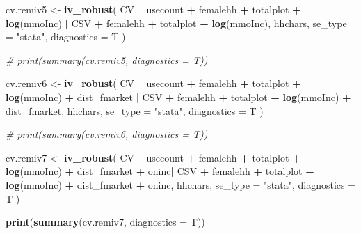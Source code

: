\documentclass[
]{article}
\newenvironment{Shaded}{\begin{snugshade}}{\end{snugshade}}
\newcommand{\CommentTok}[1]{\textcolor[rgb]{0.56,0.35,0.01}{\textit{#1}}}
\newcommand{\DataTypeTok}[1]{\textcolor[rgb]{0.13,0.29,0.53}{#1}}
\newcommand{\KeywordTok}[1]{\textcolor[rgb]{0.13,0.29,0.53}{\textbf{#1}}}
\newcommand{\NormalTok}[1]{#1}
\newcommand{\OperatorTok}[1]{\textcolor[rgb]{0.81,0.36,0.00}{\textbf{#1}}}
\newcommand{\StringTok}[1]{\textcolor[rgb]{0.31,0.60,0.02}{#1}}
\begin{document}
\begin{Shaded}
\begin{Highlighting}[]
\NormalTok{cv.remiv5 <-}
\StringTok{  }\KeywordTok{iv_robust}\NormalTok{(}
\NormalTok{    CV }\OperatorTok{~}\StringTok{ }\NormalTok{usecount }\OperatorTok{+}\StringTok{ }\NormalTok{femalehh }\OperatorTok{+}\StringTok{ }\NormalTok{totalplot }\OperatorTok{+}\StringTok{ }\KeywordTok{log}\NormalTok{(mmoInc) }\OperatorTok{|}
\StringTok{      }\NormalTok{CSV }\OperatorTok{+}\StringTok{ }\NormalTok{femalehh }\OperatorTok{+}\StringTok{ }\NormalTok{totalplot }\OperatorTok{+}\StringTok{ }\KeywordTok{log}\NormalTok{(mmoInc),}
\NormalTok{    hhchars,}
    \DataTypeTok{se_type =} \StringTok{"stata"}\NormalTok{,}
    \DataTypeTok{diagnostics =}\NormalTok{ T}
\NormalTok{  )}

\CommentTok{# print(summary(cv.remiv5, diagnostics = T))}



\NormalTok{cv.remiv6 <-}
\StringTok{  }\KeywordTok{iv_robust}\NormalTok{(}
\NormalTok{    CV }\OperatorTok{~}\StringTok{ }\NormalTok{usecount }\OperatorTok{+}\StringTok{ }\NormalTok{femalehh }\OperatorTok{+}\StringTok{ }\NormalTok{totalplot }\OperatorTok{+}\StringTok{ }\KeywordTok{log}\NormalTok{(mmoInc) }\OperatorTok{+}\StringTok{ }\NormalTok{dist_fmarket }\OperatorTok{|}
\StringTok{      }\NormalTok{CSV }\OperatorTok{+}\StringTok{ }\NormalTok{femalehh }\OperatorTok{+}\StringTok{ }\NormalTok{totalplot }\OperatorTok{+}\StringTok{ }\KeywordTok{log}\NormalTok{(mmoInc) }\OperatorTok{+}\StringTok{ }\NormalTok{dist_fmarket,}
\NormalTok{    hhchars,}
    \DataTypeTok{se_type =} \StringTok{"stata"}\NormalTok{,}
    \DataTypeTok{diagnostics =}\NormalTok{ T}
\NormalTok{  )}

\CommentTok{# print(summary(cv.remiv6, diagnostics = T))}


\NormalTok{cv.remiv7 <-}
\StringTok{  }\KeywordTok{iv_robust}\NormalTok{(}
\NormalTok{    CV }\OperatorTok{~}\StringTok{ }\NormalTok{usecount }\OperatorTok{+}\StringTok{ }\NormalTok{femalehh }\OperatorTok{+}\StringTok{ }\NormalTok{totalplot }\OperatorTok{+}\StringTok{ }\KeywordTok{log}\NormalTok{(mmoInc) }\OperatorTok{+}\StringTok{ }\NormalTok{dist_fmarket }\OperatorTok{+}\StringTok{ }\NormalTok{oninc}\OperatorTok{|}
\StringTok{      }\NormalTok{CSV }\OperatorTok{+}\StringTok{ }\NormalTok{femalehh }\OperatorTok{+}\StringTok{ }\NormalTok{totalplot }\OperatorTok{+}\StringTok{ }\KeywordTok{log}\NormalTok{(mmoInc) }\OperatorTok{+}\StringTok{ }\NormalTok{dist_fmarket }\OperatorTok{+}\StringTok{ }\NormalTok{oninc,}
\NormalTok{    hhchars,}
    \DataTypeTok{se_type =} \StringTok{"stata"}\NormalTok{,}
    \DataTypeTok{diagnostics =}\NormalTok{ T}
\NormalTok{  )}

\KeywordTok{print}\NormalTok{(}\KeywordTok{summary}\NormalTok{(cv.remiv7, }\DataTypeTok{diagnostics =}\NormalTok{ T))}
\end{Highlighting}
\end{Shaded}
\end{document}
